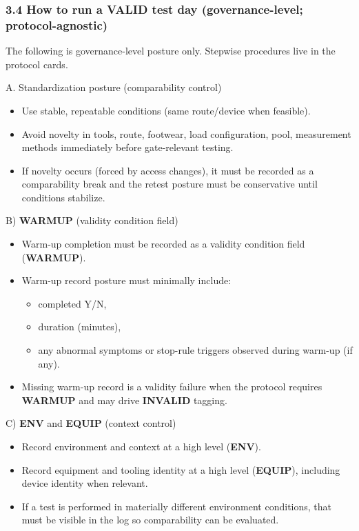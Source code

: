 \documentclass[10pt]{article}
\begin{document}
\subsubsection*{3.4 How to run a \textbf{VALID} test day (governance-level; protocol-agnostic)}

The following is governance-level posture only. Stepwise procedures live in the protocol cards.

A. Standardization posture (comparability control)

\begin{itemize}
\item Use stable, repeatable conditions (same route/device when feasible).
\item Avoid novelty in tools, route, footwear, load configuration, pool, measurement methods immediately before gate-relevant testing.
\item If novelty occurs (forced by access changes), it must be recorded as a comparability break and the retest posture must be conservative until conditions stabilize.
\end{itemize}

B) \textbf{WARMUP} (validity condition field)

\begin{itemize}
\item Warm-up completion must be recorded as a validity condition field (\textbf{WARMUP}).
\item Warm-up record posture must minimally include:
  \begin{itemize}
  \item completed Y/N,
  \item duration (minutes),
  \item any abnormal symptoms or stop-rule triggers observed during warm-up (if any).
  \end{itemize}
\item Missing warm-up record is a validity failure when the protocol requires \textbf{WARMUP} and may drive \textbf{INVALID} tagging.
\end{itemize}

C) \textbf{ENV} and \textbf{EQUIP} (context control)

\begin{itemize}
\item Record environment and context at a high level (\textbf{ENV}).
\item Record equipment and tooling identity at a high level (\textbf{EQUIP}), including device identity when relevant.
\item If a test is performed in materially different environment conditions, that must be visible in the log so comparability can be evaluated.
\end{itemize}
\end{document}
